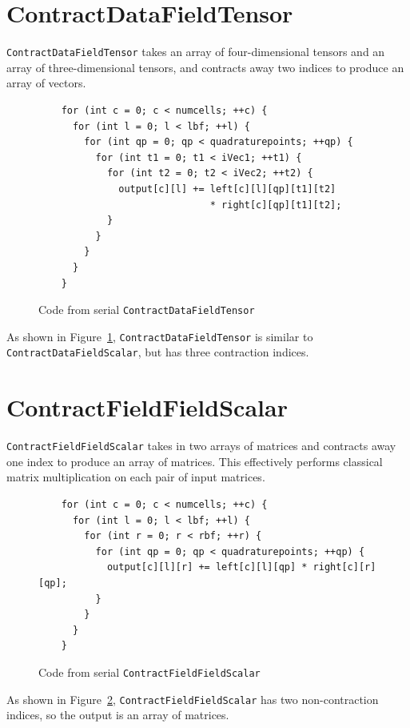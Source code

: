 \section{ContractDataFieldTensor}
\texttt{ContractDataFieldTensor} takes an array of four-dimensional tensors and
an array of three-dimensional tensors, and contracts away two indices to produce
an array of vectors.

\begin{figure}[ht]
    \begin{lstlisting}
    for (int c = 0; c < numcells; ++c) {
      for (int l = 0; l < lbf; ++l) {
        for (int qp = 0; qp < quadraturepoints; ++qp) {
          for (int t1 = 0; t1 < iVec1; ++t1) {
            for (int t2 = 0; t2 < iVec2; ++t2) {
              output[c][l] += left[c][l][qp][t1][t2] 
                              * right[c][qp][t1][t2];
            }
          }
        }
      }
    }
    \end{lstlisting}
\caption{Code from serial \texttt{ContractDataFieldTensor}
\label{lst:ContractDataFieldTensorSerial}} 
\end{figure}

As shown in Figure~\ref{lst:ContractDataFieldTensorSerial},
\texttt{ContractDataFieldTensor} is similar to \texttt{ContractDataFieldScalar},
but has three contraction indices. 

\section{ContractFieldFieldScalar}
\texttt{ContractFieldFieldScalar} takes in two arrays of matrices and contracts
away one index to produce an array of matrices. This effectively performs classical 
matrix multiplication on each pair of input matrices.

\begin{figure}[ht]
    \begin{lstlisting}
    for (int c = 0; c < numcells; ++c) {
      for (int l = 0; l < lbf; ++l) {
        for (int r = 0; r < rbf; ++r) {
          for (int qp = 0; qp < quadraturepoints; ++qp) {
            output[c][l][r] += left[c][l][qp] * right[c][r][qp];
          }
        }
      }
    }
    \end{lstlisting}
\caption{Code from serial \texttt{ContractFieldFieldScalar}
\label{lst:ContractFieldFieldScalarSerial}} 
\end{figure}

As shown in Figure~\ref{lst:ContractFieldFieldScalarSerial},
\texttt{ContractFieldFieldScalar} has two non-contraction indices, so the output
is an array of matrices.

